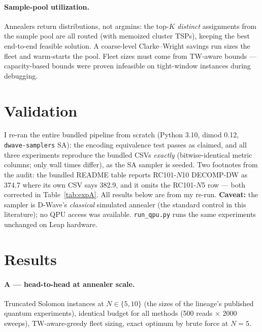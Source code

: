 \documentclass[10pt,a4paper]{article}
\begin{document}
\paragraph{Sample-pool utilization.} Annealers return distributions, not
argmins: the top-$K$ \emph{distinct} assignments from the sample pool are all
routed (with memoized cluster TSPs), keeping the best end-to-end feasible
solution. A coarse-level Clarke--Wright savings run sizes the fleet and
warm-starts the pool. Fleet sizes must come from TW-aware bounds ---
capacity-based bounds were proven infeasible on tight-window instances during
debugging.

\section{Validation}

I re-ran the entire bundled pipeline from scratch (Python 3.10, dimod 0.12,
\texttt{dwave-samplers} SA): the encoding equivalence test passes as claimed,
and all three experiments reproduce the bundled CSVs \emph{exactly} (bitwise-identical
metric columns; only wall times differ), as the SA sampler is seeded.
Two footnotes from the audit: the bundled README table reports RC101-$N$10
DECOMP-DW as 374.7 where its own CSV says 382.9, and it omits the RC101-$N$5
row --- both corrected in Table~\ref{tab:expA}. All results below are from my
re-run. \textbf{Caveat:} the sampler is D-Wave's \emph{classical} simulated
annealer (the standard control in this literature); no QPU access was
available. \texttt{run\_qpu.py} runs the same experiments unchanged on Leap
hardware.

\section{Results}

\paragraph{A --- head-to-head at annealer scale.} Truncated Solomon instances
at $N\in\{5,10\}$ (the sizes of the lineage's published quantum experiments),
identical budget for all methods (500 reads $\times$ 2000 sweeps),
TW-aware-greedy fleet sizing, exact optimum by brute force at $N=5$.

\begin{table}[h]\centering\small
\caption{Experiment A. \emph{vars} = total binaries; \emph{max BQM} = largest
single QUBO sampled; distances are the best TW/capacity-feasible decoded
solutions. Every method returned 100\% \emph{structurally} valid samples;
``infeasible'' means none of 500 valid samples respected the time windows.
DECOMP-OH rows are omitted: identical distances to DECOMP-DW with more
variables (e.g.\ 217 vs.\ 162 on C101-$N$10).}
\label{tab:expA}

\end{table}
\end{document}
